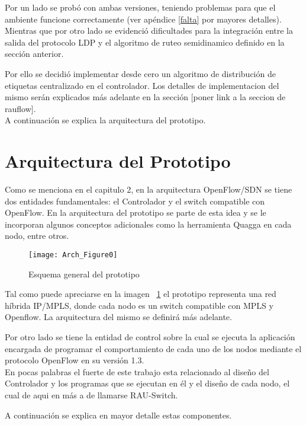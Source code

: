 Por un lado se prob\'o con ambas versiones, teniendo problemas para que el ambiente funcione correctamente (ver apéndice \ref{falta} por mayores detalles). Mientras que por otro lado se evidenci\'o dificultades para la integración entre la salida del protocolo LDP y el algoritmo de ruteo semidinamico definido en la sección anterior.

Por ello se decidi\'o implementar desde cero un algoritmo de distribución de etiquetas centralizado en el controlador. Los detalles de implementacion del mismo ser\'an explicados m\'as adelante en la sección [poner link a la seccion de rauflow].\\

A continuación se explica la arquitectura del prototipo. 

\section{Arquitectura del Prototipo}

Como se menciona en el capitulo 2, en la arquitectura OpenFlow/SDN se tiene dos entidades fundamentales: el Controlador y el switch compatible con OpenFlow. En la arquitectura del prototipo se  parte de esta idea y se le incorporan algunos conceptos adicionales como la herramienta Quagga en cada nodo, entre otros.\\

\begin{figure}[htbp!] 
\centering    
\texttt{[image: Arch\_Figure0]}
\caption[OpenSourceRArch0]{Esquema general del prototipo}
\label{fig:OpenSourceRArch0}
\end{figure}

Tal como puede apreciarse en la imagen ~\ref{fig:OpenSourceRArch0} el prototipo representa una red h\'ibrida IP/MPLS, donde cada nodo es un switch compatible con MPLS y Openflow. La arquitectura del mismo se definir\'a m\'as adelante. 

Por otro lado se tiene la entidad de control sobre la cual se ejecuta la aplicaci\'on encargada de programar el comportamiento de cada uno de los nodos mediante el protocolo OpenFlow en su versi\'on 1.3.\\

En pocas palabras el fuerte de este trabajo esta relacionado al diseño del Controlador y los programas que se ejecutan en \'el y el diseño de cada nodo, el cual de aqui en m\'as a de llamarse RAU-Switch.

A continuaci\'on se explica en mayor detalle estas componentes.

